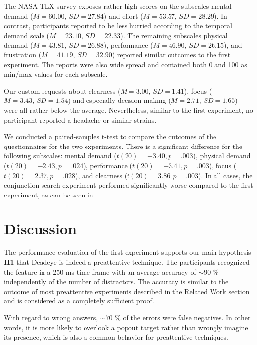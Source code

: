 \documentclass[journal]{vgtc}                %
\begin{document}
The NASA-TLX survey exposes rather high scores on the subscales mental demand ($M = 60.00,\,SD = 27.84$) and effort ($M = 53.57,\,SD = 28.29$). In contrast, participants reported to be less hurried according to the temporal demand scale ($M = 23.10,\,SD = 22.33$). The remaining subscales physical demand ($M = 43.81,\,SD = 26.88$), performance ($M = 46.90,\,SD = 26.15$), and frustration ($M = 41.19,\,SD = 32.90$) reported similar outcomes to the first experiment. The reports were also wide spread and contained both 0 and 100 as min/max values for each subscale.

Our custom requests about clearness ($M = 3.00,\,SD = 1.41$), focus ($M = 3.43,\,SD = 1.54$) and especially decision-making ($M = 2.71,\,SD = 1.65$) 
were all rather below the average. Nevertheless, similar to the first experiment, no participant reported a headache or similar strains.

We conducted a paired-samples t-test to compare the outcomes of the questionnaires for the two experiments. There is a significant difference for the following subscales: mental demand ($t(20) = -3.40, p = .003$), physical demand ($t(20) = -2.43, p = .024$), performance ($t(20) = -3.41, p = .003$), focus ($t(20) = 2.37, p = .028$), and clearness ($t(20) = 3.86, p = .003$). In all cases, the conjunction search experiment performed significantly worse compared to the first experiment, as can be seen in .

%
%
%



\section{Discussion}

The performance evaluation of the first experiment supports our main hypothesis \textbf{H1} that Deadeye is indeed a preattentive technique. The participants recognized the feature in a 250 ms time frame with an average accuracy of {$\sim90$ \%} independently of the number of distractors. The accuracy is similar to the outcome of most preattentive experiments described in the Related Work section and is considered as a completely sufficient proof. 

With regard to wrong answers, $\sim70$ \% of the errors were false negatives. In other words, it is more likely to overlook a popout target rather than wrongly imagine its presence, which is also a common behavior for preattentive techniques. 
\end{document}
